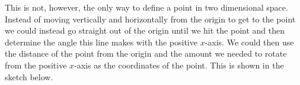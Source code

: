 \documentclass[10pt,reqno]{book}
\theoremstyle{definition}
\begin{document}
	\begin{center}
	\end{center}

	\noindent This is not, however, the only way to define a point in two dimensional space. Instead of moving vertically and horizontally from the origin to get to the point we could instead go straight out of the origin until we hit the point and then determine the angle this line makes with the positive $ x $-axis. We could then use the distance of the point from the origin and the amount we needed to rotate from the positive $ x $-axis as the coordinates of the point. This is shown in the sketch below.
	
\end{document}
